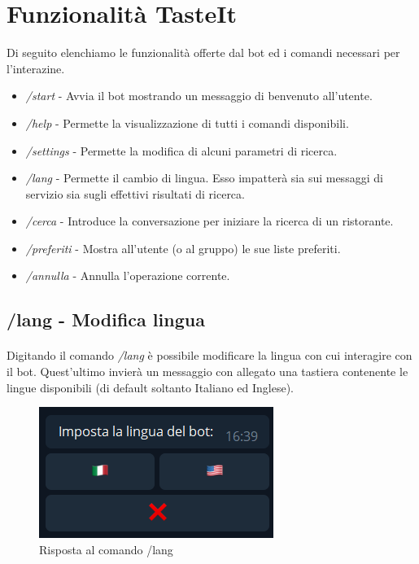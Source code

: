 \documentclass[a4paper, 12pt]{article}
\begin{document}
	\section{Funzionalità TasteIt}
	Di seguito elenchiamo le funzionalità offerte dal bot ed i comandi necessari per l'interazine.
	\begin{itemize}
		\item \textit{/start} - Avvia il bot mostrando un messaggio di benvenuto all'utente.
		\item \textit{/help} - Permette la visualizzazione di tutti i comandi disponibili.
		\item \textit{/settings} - Permette la modifica di alcuni parametri di ricerca.
		\item \textit{/lang} - Permette il cambio di lingua. Esso impatterà sia sui messaggi di servizio sia sugli effettivi risultati di ricerca.
		\item \textit{/cerca} - Introduce la conversazione per iniziare la ricerca di un ristorante.
		\item \textit{/preferiti} - Mostra all'utente (o al gruppo) le sue liste preferiti.
		\item \textit{/annulla} - Annulla l'operazione corrente.
	\end{itemize}
	
	\subsection{/lang - Modifica lingua}
	\paragraph{}
	Digitando il comando \textit{/lang} è possibile modificare la lingua con cui interagire con il bot. Quest'ultimo invierà un messaggio con allegato una tastiera contenente le lingue disponibili (di default soltanto Italiano ed Inglese).
	
	\begin{figure}[h!]
		\centering
		\includegraphics[scale=1.1]{langCommand.png}
		\caption{Risposta al comando /lang}
	\end{figure}
\end{document}

